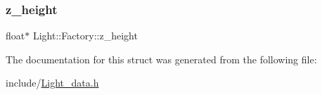 \subsubsection{\texorpdfstring{z\+\_\+height}{z\_height}}
{\footnotesize\ttfamily float$\ast$ Light\+::\+Factory\+::z\+\_\+height}



The documentation for this struct was generated from the following file\+:\begin{DoxyCompactItemize}
\item 
include/\mbox{\hyperlink{_light__data_8h}{Light\+\_\+data.\+h}}\end{DoxyCompactItemize}
